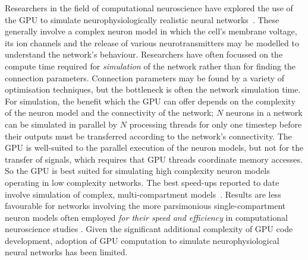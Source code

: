 \documentclass[12pt, a4paper]{article}
\begin{document}
Researchers in the field of computational neuroscience have explored the use
of the GPU to simulate neurophysiologically realistic neural
networks~\cite{beyeler_gpu-accelerated_2015,yavuz_genn_2016}. These
generally involve a complex neuron model in which the cell's membrane voltage,
its ion channels and the release of various neurotransmitters may be modelled
to understand the network's behaviour. Researchers have often focussed on the
compute time required for
\emph{simulation} of the network
rather than for finding the connection parameters. Connection parameters may
be found by a variety of optimisation techniques, but the bottleneck is often
the network simulation time. For simulation, the benefit which the GPU can
offer depends on the complexity of the neuron model and the connectivity of
the network; $N$ neurons in a network can be simulated in parallel by $N$
processing threads for only one timestep before their outputs must be
transferred according to the network's connectivity. The GPU is well-suited to
the parallel execution of the neuron models, but not for the transfer of
signals, which requires that GPU threads coordinate memory accesses. So the
GPU is best suited for simulating high complexity neuron models operating in
low complexity networks. The best speed-ups reported to date involve
simulation of complex, multi-compartment
models~\cite{stimberg_brian2genn_2020}. Results are less favourable for
networks involving the more parsimonious single-compartment neuron models
often employed \emph{for their speed and efficiency} in computational
neuroscience studies \cite{nageswaran_configurable_2009}. Given the
significant additional complexity of GPU code development, adoption of GPU
computation to simulate neurophysiological neural networks has been limited.
\end{document}
